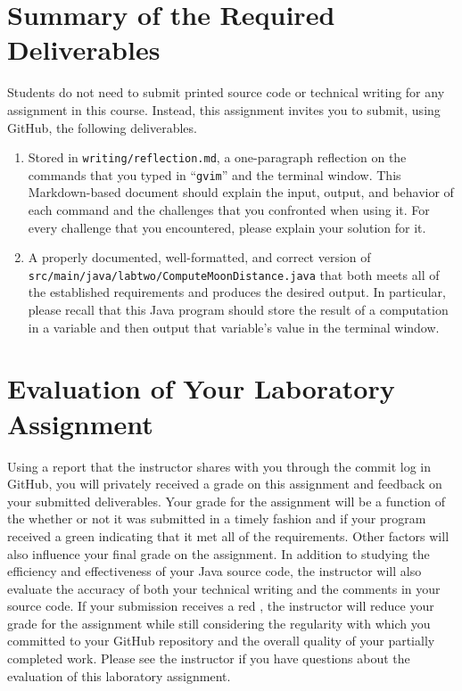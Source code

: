 \documentclass[11pt]{article}
\newcommand{\mainprogramsource}{\lstinline{src/main/java/labtwo/ComputeMoonDistance.java}}
\newcommand{\reflection}{\lstinline{writing/reflection.md}}
\newcommand{\command}[1]{``\lstinline{#1}''}
\newcommand{\checkmark}{\ding{51}}
\newcommand{\naughtmark}{\ding{55}}
\begin{document}
\section*{Summary of the Required Deliverables}

\noindent Students do not need to submit printed source code or technical
writing for any assignment in this course. Instead, this assignment invites you
to submit, using GitHub, the following deliverables.

\begin{enumerate}

\setlength{\itemsep}{0in}

\item Stored in \reflection{}, a one-paragraph reflection on the commands that
  you typed in \command{gvim} and the terminal window. This Markdown-based
  document should explain the input, output, and behavior of each command and
  the challenges that you confronted when using it. For every challenge that you
  encountered, please explain your solution for it.

\item A properly documented, well-formatted, and correct version of
  \mainprogramsource{} that both meets all of the established requirements and
  produces the desired output. In particular, please recall that this Java
  program should store the result of a computation in a variable and then output
  that variable's value in the terminal window.

\end{enumerate}

\section*{Evaluation of Your Laboratory Assignment}

Using a report that the instructor shares with you through the commit log in GitHub, you will privately received a grade
on this assignment and feedback on your submitted deliverables. Your grade for the assignment will be a function of the
whether or not it was submitted in a timely fashion and if your program received a green \checkmark{} indicating that it
met all of the requirements. Other factors will also influence your final grade on the assignment. In addition to
studying the efficiency and effectiveness of your Java source code, the instructor will also evaluate the accuracy of
both your technical writing and the comments in your source code. If your submission receives a red \naughtmark{}, the
instructor will reduce your grade for the assignment while still considering the regularity with which you committed to
your GitHub repository and the overall quality of your partially completed work. Please see the instructor if you have
questions about the evaluation of this laboratory assignment.
\end{document}
